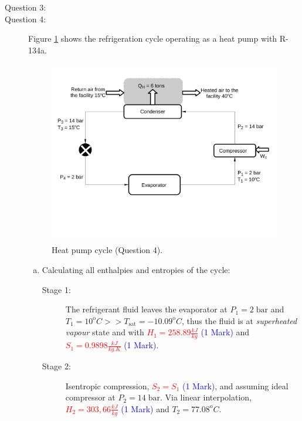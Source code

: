 \documentclass[12pt,twoside]{report}
\newcommand{\frc}{\displaystyle\frac}
\begin{document}
\begin{description}
\clearpage

\item [Question 3:]

\clearpage


\item [Question 4:] Figure \ref{Exam01_Prob4} shows the refrigeration cycle operating as a heat pump with R-134a.

\begin{figure}[h]
\begin{center}
\includegraphics[width=12.0cm,height=8.0cm]{./Pics/Overview_Refrig42}
\vspace{-2cm}
\caption{Heat pump cycle (Question 4).}\label{Exam01_Prob4}
\end{center}
\end{figure}


\begin{enumerate}[(a)]
%
\item Calculating all enthalpies and entropies of the cycle:
\begin{description}
\item [Stage 1:] The refrigerant fluid leaves the evaporator at $P_{1}= 2\;\text{bar}$ and $T_{1}=10^{\text{o}}C >> T_{\text{sat}}=-10.09^{\text{o}}C$, thus the fluid is at {\it superheated vapour} state and with \textcolor{red}{$H_{1}=258.89\frc{kJ}{kg}$} \textcolor{blue}{(1 Mark)} and \textcolor{red}{$S_{1}=0.9898\frc{kJ}{kg.K}$} \textcolor{blue}{(1 Mark)}.

\item [Stage 2:] Isentropic compression, \textcolor{red}{$S_{2}=S_{1}$} \textcolor{blue}{(1 Mark)}, and assuming ideal compressor at $P_{2}=14\;\text{bar}$. Via linear interpolation, \textcolor{red}{$H_{2}=303,66\frc{kJ}{kg}$} \textcolor{blue}{(1 Mark)} and $T_{2}=77.08^{\text{o}}C$.


\end{description}
\end{enumerate}
\end{description}
\end{document}
